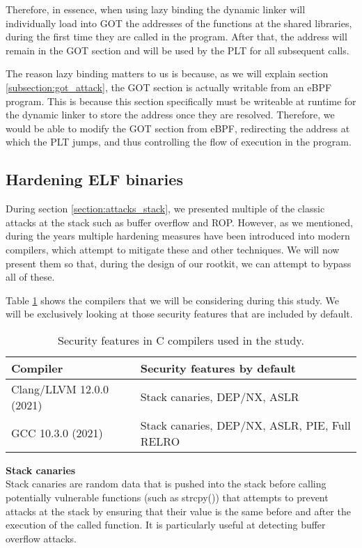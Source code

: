 Therefore, in essence, when using lazy binding the dynamic linker will individually load into GOT the addresses of the functions at the shared libraries, during the first time they are called in the program. After that, the address will remain in the GOT section and will be used by the PLT for all subsequent calls.

The reason lazy binding matters to us is because, as we will explain section \ref{subsection:got_attack}, the GOT section is actually writable from an eBPF program. This is because this section specifically must be writeable at runtime for the dynamic linker to store the address once they are resolved. Therefore, we would be able to modify the GOT section from eBPF, redirecting the address at which the PLT jumps, and thus controlling the flow of execution in the program. 

\subsection{Hardening ELF binaries} \label{subsection:hardening_elf}
During section \ref{section:attacks_stack}, we presented multiple of the classic attacks at the stack such as buffer overflow and ROP. However, as we mentioned, during the years multiple hardening measures have been introduced into modern compilers, which attempt to mitigate these and other techniques. We will now present them so that, during the design of our rootkit, we can attempt to bypass all of these.

Table \ref{table:compilers} shows the compilers that we will be considering during this study. We will be exclusively looking at those security features that are included by default.

\begin{table}[htbp]
\begin{tabular}{|>{\centering\arraybackslash}p{5cm}|>{\centering\arraybackslash}p{9cm}|}
\hline
Compiler & Security features by default\\
\hline
\hline
Clang/LLVM 12.0.0 (2021) & Stack canaries, DEP/NX, ASLR\\
\hline
GCC 10.3.0 (2021) & Stack canaries, DEP/NX, ASLR, PIE, Full RELRO\\
\hline 
\end{tabular}
\caption{Security features in C compilers used in the study.}
\label{table:compilers}
\end{table}

\textbf{Stack canaries}\\
Stack canaries are random data that is pushed into the stack before calling potentially vulnerable functions (such as strcpy()) that attempts to prevent attacks at the stack by ensuring that their value is the same before and after the execution of the called function. It is particularly useful at detecting buffer overflow attacks.

